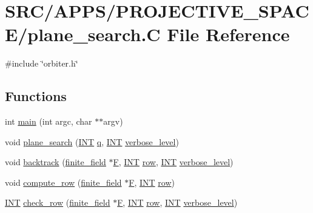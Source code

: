 \hypertarget{plane__search_8_c}{}\section{S\+R\+C/\+A\+P\+P\+S/\+P\+R\+O\+J\+E\+C\+T\+I\+V\+E\+\_\+\+S\+P\+A\+C\+E/plane\+\_\+search.C File Reference}
\label{plane__search_8_c}
{\ttfamily \#include \char`\"{}orbiter.\+h\char`\"{}}\newline
\subsection*{Functions}
\begin{DoxyCompactItemize}
\item 
int \mbox{\hyperlink{plane__search_8_c_a3c04138a5bfe5d72780bb7e82a18e627}{main}} (int argc, char $\ast$$\ast$argv)
\item 
void \mbox{\hyperlink{plane__search_8_c_a139312fcd3ab6cbe6643c4797ee21409}{plane\+\_\+search}} (\mbox{\hyperlink{galois_8h_a09fddde158a3a20bd2dcadb609de11dc}{I\+NT}} \mbox{\hyperlink{simeon_8_c_a92cbb483a3b27ae1a0dbfcb125ce216f}{q}}, \mbox{\hyperlink{galois_8h_a09fddde158a3a20bd2dcadb609de11dc}{I\+NT}} \mbox{\hyperlink{simeon_8_c_a818073fbcc2f439e7c56952f67386122}{verbose\+\_\+level}})
\item 
void \mbox{\hyperlink{plane__search_8_c_af27df65bfff017a03b67e880f2f19ffb}{backtrack}} (\mbox{\hyperlink{classfinite__field}{finite\+\_\+field}} $\ast$\mbox{\hyperlink{simeon_8_c_a21a61c535ff7d9d4b674461d3b19fffa}{F}}, \mbox{\hyperlink{galois_8h_a09fddde158a3a20bd2dcadb609de11dc}{I\+NT}} \mbox{\hyperlink{k__arc__lifting_8_c_a08f320aaf2bdf98a334241375f7ce1e7}{row}}, \mbox{\hyperlink{galois_8h_a09fddde158a3a20bd2dcadb609de11dc}{I\+NT}} \mbox{\hyperlink{simeon_8_c_a818073fbcc2f439e7c56952f67386122}{verbose\+\_\+level}})
\item 
void \mbox{\hyperlink{plane__search_8_c_af945111d9c2dbe8ffc1478275c7d4d15}{compute\+\_\+row}} (\mbox{\hyperlink{classfinite__field}{finite\+\_\+field}} $\ast$\mbox{\hyperlink{simeon_8_c_a21a61c535ff7d9d4b674461d3b19fffa}{F}}, \mbox{\hyperlink{galois_8h_a09fddde158a3a20bd2dcadb609de11dc}{I\+NT}} \mbox{\hyperlink{k__arc__lifting_8_c_a08f320aaf2bdf98a334241375f7ce1e7}{row}})
\item 
\mbox{\hyperlink{galois_8h_a09fddde158a3a20bd2dcadb609de11dc}{I\+NT}} \mbox{\hyperlink{plane__search_8_c_a7c747c8628656ffafe9b2d862bbd6751}{check\+\_\+row}} (\mbox{\hyperlink{classfinite__field}{finite\+\_\+field}} $\ast$\mbox{\hyperlink{simeon_8_c_a21a61c535ff7d9d4b674461d3b19fffa}{F}}, \mbox{\hyperlink{galois_8h_a09fddde158a3a20bd2dcadb609de11dc}{I\+NT}} \mbox{\hyperlink{k__arc__lifting_8_c_a08f320aaf2bdf98a334241375f7ce1e7}{row}}, \mbox{\hyperlink{galois_8h_a09fddde158a3a20bd2dcadb609de11dc}{I\+NT}} \mbox{\hyperlink{simeon_8_c_a818073fbcc2f439e7c56952f67386122}{verbose\+\_\+level}})
$$
\end{DoxyCompactItemize}
